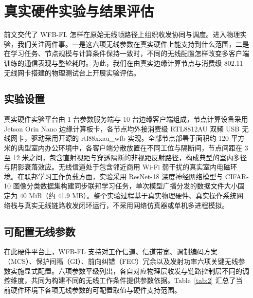\section{真实硬件实验与结果评估}
\label{sec:4}

前文交代了 WFB-FL 怎样在原始无线帧路径上组织收发协同与调度。进入物理实验，我们关注两件事。一是这六项无线参数在真实硬件上能支持到什么范围，二是在学习任务、节点规模与计算条件保持一致时，不同的无线配置怎样改变多客户端训练的通信表现与整轮耗时。为此，我们在由真实边缘计算节点与消费级 802.11 无线网卡搭建的物理测试台上开展实验评估。

\subsection{实验设置}

真实硬件实验平台由 1 台参数服务端与 10 台边缘客户端组成，节点计算设备采用 Jetson Orin Nano 边缘计算板卡，各节点均外接消费级 RTL8812AU 双频 USB 无线网卡，驱动采用开源的 rtl88xxau\_wfb 实现。全部节点部署于面积约 120 平方米的典型室内办公环境中，各客户端分散放置在不同工位与隔断间，节点间距在 3 至 12 米之间，包含直射视距与穿透隔断的非视距反射路径，构成典型的室内多径与阴影衰落效应。无线信道处于包含邻近商用 Wi-Fi 弱干扰的真实室内电磁环境。在联邦学习工作负载方面，实验采用 ResNet-18 深度神经网络模型与 CIFAR-10 图像分类数据集构建同步联邦学习任务，单次模型广播分发的数据文件大小固定为 40 MiB（约 41.9 MB）。整个实验过程基于真实物理硬件、真实操作系统网络栈与真实无线链路收发闭环运行，不采用网络仿真器或单机多进程模拟。

\subsection{可配置无线参数}

在此硬件平台上，WFB-FL 支持对工作信道、信道带宽、调制编码方案（MCS）、保护间隔（GI）、前向纠错（FEC）冗余以及发射功率六项关键无线参数实施显式配置。六项参数平级列出，各自对应物理层收发与链路控制层不同的调控维度，共同为构建不同的无线工作条件提供参数依据。Table~\ref{tab:2} 汇总了当前硬件环境下各项无线参数的可配置取值与硬件支持范围。



